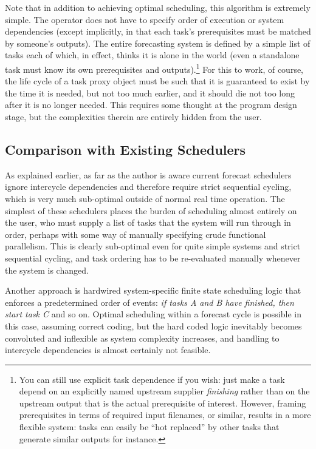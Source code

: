 \documentclass[11pt,a4paper]{article}
\begin{document}
Note that in addition to achieving optimal scheduling, this algorithm is
extremely simple. The operator does not have to specify order of
execution or system dependencies (except implicitly, in that each task's
prerequisites must be matched by someone's outputs). The entire
forecasting system is defined by a simple list of tasks each of which,
in effect, thinks it is alone in the world (even a standalone task must
know its own prerequisites and outputs).\footnote{You can still use
explicit task dependence if you wish: just make a task depend on an
explicitly named upstream supplier {\em finishing} rather than on the
upstream output that is the actual prerequisite of interest. However,
framing prerequisites in terms of required input filenames, or similar,
results in a more flexible system: tasks can easily be ``hot replaced''
by other tasks that generate similar outputs for instance.}  For this to
work, of course, the life cycle of a task proxy object must be such that
it is guaranteed to exist by the time it is needed, but not too much
earlier, and it should die not too long after it is no longer needed.
This requires some thought at the program design stage, but the
complexities therein are entirely hidden from the user. 

\subsection{Comparison with Existing Schedulers}

As explained earlier, as far as the author is aware current forecast
schedulers ignore intercycle dependencies and therefore require
strict sequential cycling, which is very much sub-optimal outside of
normal real time operation. The simplest of these schedulers places the
burden of scheduling almost entirely on the user, who must supply a list
of tasks that the system will run through in order, perhaps with some
way of manually specifying crude functional parallelism.  This is
clearly sub-optimal even for quite simple systems and strict sequential
cycling, and task ordering has to be re-evaluated manually whenever the
system is changed. 

Another approach is hardwired system-specific finite state scheduling
logic that enforces a predetermined order of events: {\em if tasks A and
B have finished, then start task C} and so on. Optimal scheduling within
a forecast cycle is possible in this case, assuming correct coding, but
the hard coded logic inevitably becomes convoluted and inflexible as
system complexity increases, and handling to intercycle dependencies is
almost certainly not feasible.  
\end{document}

